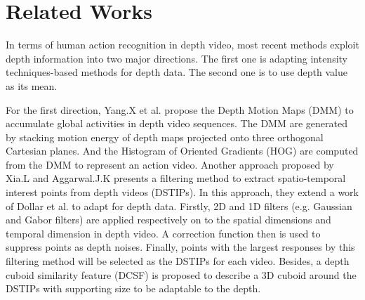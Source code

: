 \documentclass[review]{elsarticle}
\begin{document}


\section{Related Works}
\label{lbl:RelatedWorks}

In terms of human action recognition in depth video, most recent methods exploit depth information into two major directions. The first one is adapting intensity techniques-based methods for depth data. The second one is to use depth value as its mean.

For the first direction, Yang.X et al. \cite{yang2012recognizing} propose the Depth Motion Maps (DMM) to accumulate global activities in depth video sequences. The DMM are generated by stacking motion energy of depth maps projected onto three orthogonal Cartesian planes. And the Histogram of Oriented Gradients (HOG) \cite{dalal2005histograms} are computed from the DMM to represent an action video. Another approach proposed by Xia.L and Aggarwal.J.K \cite{xia2013spatio} presents a filtering method to extract spatio-temporal interest points from depth videos (DSTIPs). In this approach, they extend a work of Dollar et al. \cite{dollar2005behavior} to adapt for depth data. Firstly, 2D and 1D filters (e.g. Gaussian and Gabor filters) are applied respectively on to the spatial dimensions and temporal dimension in depth video. A correction function then is used to suppress points as depth noises. Finally, points with the largest responses by this filtering method will be selected as the DSTIPs for each video. Besides, a depth cuboid similarity feature (DCSF) is proposed to describe a 3D cuboid around the DSTIPs with supporting size to be adaptable to the depth.
\end{document}
